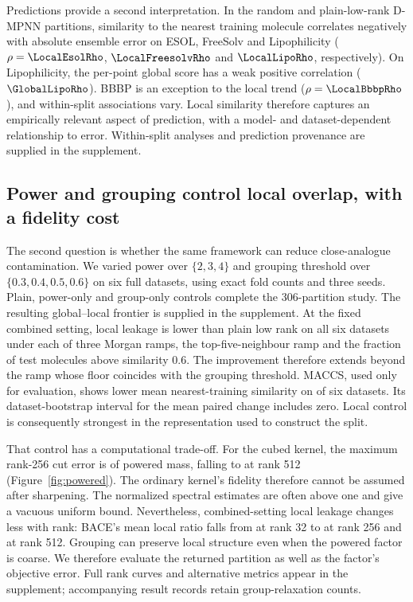 Predictions provide a second interpretation. In the random and plain-low-rank
D-MPNN partitions, similarity to the nearest training molecule correlates
negatively with absolute ensemble error on ESOL, FreeSolv and Lipophilicity
($\rho=\LocalEsolRho$, $\LocalFreesolvRho$ and $\LocalLipoRho$, respectively).
On Lipophilicity, the per-point global score has a weak positive correlation
($\GlobalLipoRho$). BBBP is an exception to the local trend
($\rho=\LocalBbbpRho$), and within-split associations vary. Local similarity
therefore captures an empirically relevant aspect of prediction, with a
model- and dataset-dependent relationship to error. Within-split analyses and
prediction provenance are supplied in the supplement.

\subsection{Power and grouping control local overlap, with a fidelity cost}

The second question is whether the same framework can reduce close-analogue
contamination. We varied power over $\{2,3,4\}$ and grouping threshold over
$\{0.3,0.4,0.5,0.6\}$ on six full datasets, using exact fold counts and three
seeds. Plain, power-only and group-only controls complete the 306-partition
study. The resulting global--local frontier is supplied in the supplement.
At the fixed combined setting, local leakage is lower than plain low rank on
all six datasets under each of three Morgan ramps, the top-five-neighbour ramp
and the fraction of test molecules above similarity 0.6. The improvement
therefore extends beyond the ramp whose floor coincides with the grouping
threshold. MACCS, used only for evaluation, shows lower mean nearest-training
similarity on \RobustMaccsWins{} of six datasets. Its dataset-bootstrap interval
for the mean paired change includes zero. Local control is consequently strongest
in the representation used to construct the split.

That control has a computational trade-off. For the cubed kernel, the maximum
rank-256 cut error is \PowerFidelityError{} of powered mass, falling to
\PowerHighRankError{} at rank 512 (Figure~\ref{fig:powered}). The ordinary
kernel's fidelity therefore cannot be assumed after sharpening. The normalized
spectral estimates are often above one and give a vacuous uniform bound.
Nevertheless, combined-setting local leakage changes less with rank: BACE's
mean local ratio falls from \BaceRankSmall{} at rank 32 to
\BaceRankDefault{} at rank 256 and \BaceRankLarge{} at rank 512.
Grouping can preserve local structure even when the powered factor is coarse.
We therefore evaluate the returned partition as well as the factor's objective
error. Full rank curves and alternative metrics appear in the supplement;
accompanying result records retain group-relaxation counts.

